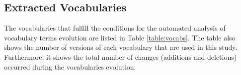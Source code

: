 \subsection{Extracted Vocabularies}
The vocabularies that fulfill the conditions for the automated analysis of vocabulary terms evolution are listed in Table \ref{table:vocabs}. The table also shows the number of versions of each vocabulary that are used in this study. Furthermore, it shows the total number of changes (additions and deletions) occurred during the vocabularies evolution.

